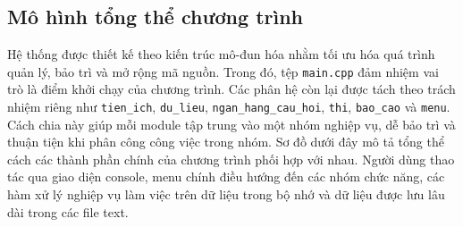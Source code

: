 \documentclass[12pt,a4paper]{report}
\begin{document}
\subsection{Mô hình tổng thể chương trình}

Hệ thống được thiết kế theo kiến trúc mô-đun hóa nhằm tối ưu hóa quá trình quản lý, bảo trì và mở rộng mã nguồn. Trong đó, tệp \texttt{main.cpp} đảm nhiệm vai trò là điểm khởi chạy của chương trình. Các phân hệ còn lại được tách theo trách nhiệm riêng như \texttt{tien\_ich}, \texttt{du\_lieu}, \texttt{ngan\_hang\_cau\_hoi}, \texttt{thi}, \texttt{bao\_cao} và \texttt{menu}. Cách chia này giúp mỗi module tập trung vào một nhóm nghiệp vụ, dễ bảo trì và thuận tiện khi phân công công việc trong nhóm.
Sơ đồ dưới đây mô tả tổng thể cách các thành phần chính của chương trình phối hợp với nhau. Người dùng thao tác qua giao diện console, menu chính điều hướng đến các nhóm chức năng, các hàm xử lý nghiệp vụ làm việc trên dữ liệu trong bộ nhớ và dữ liệu được lưu lâu dài trong các file text.
\end{document}
